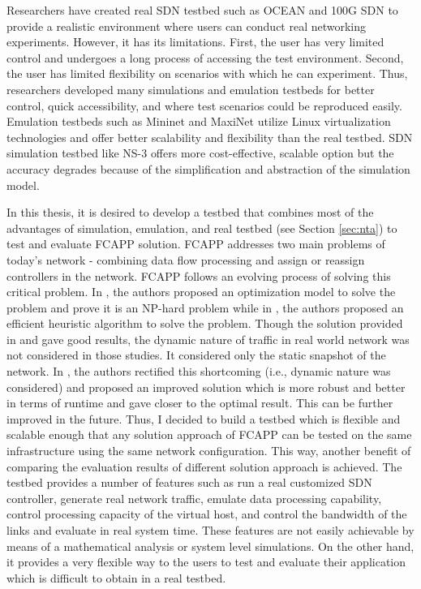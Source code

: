 Researchers have created real SDN testbed such as OCEAN \cite{ocean} and 100G SDN \cite{100gsdn} to provide a realistic environment where users can conduct real networking experiments. However, it has its limitations. First, the user has very limited control and undergoes a long process of accessing the test environment. Second, the user has limited flexibility on scenarios with which he can experiment. Thus, researchers developed many simulations and emulation testbeds for better control, quick accessibility, and where test scenarios could be reproduced easily. Emulation testbeds such as Mininet \cite{min-intro} and MaxiNet \cite{max-over} utilize Linux virtualization technologies and offer better scalability and flexibility than the real testbed. SDN simulation testbed like NS-3 \cite{ns-3} offers more cost-effective, scalable option but the accuracy degrades because of the simplification and abstraction of the simulation model.

In this thesis, it is desired to develop a testbed that combines most of the advantages of simulation, emulation, and real testbed (see Section \ref{sec:nta}) to test and evaluate FCAPP solution. FCAPP addresses two main problems of today's network - combining data flow processing and assign or reassign controllers in the network. FCAPP follows an evolving process of solving this critical problem. In \cite{7136368}, the authors proposed an optimization model to solve the problem and prove it is an NP-hard problem while in \cite{7127739}, the authors proposed an efficient heuristic algorithm to solve the problem. Though the solution provided in \cite{7136368} and \cite{7127739} gave good results, the dynamic nature of traffic in real world network was not considered in those studies. It considered only the static snapshot of the network. In \cite{7343600}, the authors rectified this shortcoming (i.e., dynamic nature was considered) and proposed an improved solution which is more robust and better in terms of runtime and gave closer to the optimal result. This can be further improved in the future. Thus, I decided to build a testbed which is flexible and scalable enough that any solution approach of FCAPP can be tested on the same infrastructure using the same network configuration. This way, another benefit of comparing the evaluation results of different solution approach is achieved. The testbed provides a number of features such as run a real customized SDN controller, generate real network traffic, emulate data processing capability, control processing capacity of the virtual host, and control the bandwidth of the links and evaluate in real system time. These features are not easily achievable by means of a mathematical analysis or system level simulations. On the other hand, it provides a very flexible way to the users to test and evaluate their application which is difficult to obtain in a real testbed.

